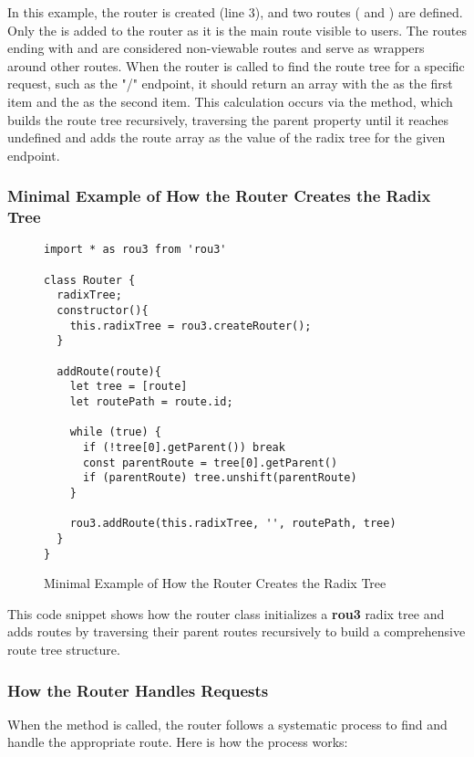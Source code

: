 In this example, the router is created (line 3), and two routes ( and ) are defined. Only the  is added to the router as it is the main route visible to users. The routes ending with  and  are considered non-viewable routes and serve as wrappers around other routes. When the router is called to find the route tree for a specific request, such as the "/" endpoint, it should return an array with the  as the first item and the  as the second item. This calculation occurs via the  method, which builds the route tree recursively, traversing the parent property until it reaches undefined and adds the route array as the value of the radix tree for the given endpoint.

\pagebreak

\subsubsection*{Minimal Example of How the Router Creates the Radix Tree}
\begin{figure}[h!]
\begin{verbatim}
import * as rou3 from 'rou3'

class Router {
  radixTree;
  constructor(){
    this.radixTree = rou3.createRouter();
  }

  addRoute(route){
    let tree = [route]
    let routePath = route.id;

    while (true) {
      if (!tree[0].getParent()) break
      const parentRoute = tree[0].getParent()
      if (parentRoute) tree.unshift(parentRoute)
    }

    rou3.addRoute(this.radixTree, '', routePath, tree)
  }
}
\end{verbatim}
\caption{Minimal Example of How the Router Creates the Radix Tree}
\end{figure}

This code snippet shows how the router class initializes a \textbf{rou3} radix tree and adds routes by traversing their parent routes recursively to build a comprehensive route tree structure.





\subsubsection{How the Router Handles Requests}

When the  method is called, the router follows a systematic process to find and handle the appropriate route. Here is how the process works:

